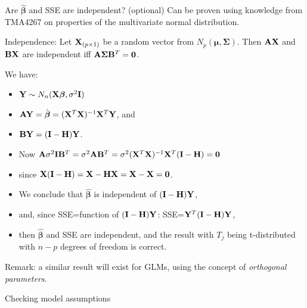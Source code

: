 \documentclass[
  ignorenonframetext,
]{beamer}
\begin{document}
\begin{frame}
\begin{block}{Are \(\hat{\boldsymbol{\beta}}\) and SSE are independent?
(optional)}
\label{are-hatboldsymbolbeta-and-sse-are-independent-optional}
Can be proven using knowledge from TMA4267 on properties of the
multivariate normal distribution.

Independence: Let \({\bf X}_{(p \times 1)}\) be a random vector from
\(N_p({\boldsymbol \mu},{\boldsymbol \Sigma})\). Then \({\bf A}{\bf X}\)
and \({\bf B}{\bf X}\) are independent iff
\({\bf A}{\boldsymbol \Sigma}{\bf B}^T={\bf 0}\).

We have:

\begin{itemize}
\item
  \({\bf Y}\sim N_n({\bf X}{\boldsymbol \beta},\sigma^2{\bf I})\)
\item
  \({\bf AY}=\hat{{\boldsymbol \beta}}=({\bf X}^T{\bf X})^{-1}{\bf X}^T {\bf Y}\),
  and
\item
  \({\bf BY}=({\bf I}-{\bf H}){\bf Y}\).
\item
  Now
  \({\bf A}\sigma^2{\bf I}{\bf B}^T=\sigma^2 {\bf A}{\bf B}^T=\sigma^2 ({\bf X}^T{\bf X})^{-1}{\bf X}^T ({\bf I}-{\bf H})={\bf 0}\)
\item
  since
  \({\bf X}({\bf I}-{\bf H})={\bf X}-{\bf HX}={\bf X}-{\bf X}={\bf 0}\).
\item
  We conclude that \(\hat{{\boldsymbol \beta}}\) is independent of
  \(({\bf I}-{\bf H}){\bf Y}\),
\item
  and, since SSE=function of \(({\bf I}-{\bf H}){\bf Y}\):
  SSE=\({\bf Y}^T({\bf I}-{\bf H}){\bf Y}\),
\item
  then \(\hat{{\boldsymbol \beta}}\) and SSE are independent, and the
  result with \(T_j\) being t-distributed with \(n-p\) degrees of
  freedom is correct.
\end{itemize}

Remark: a similar result will exist for GLMs, using the concept of
\emph{orthogonal parameters}.
\end{block}
\end{frame}

\begin{frame}{Checking model assumptions}
\label{checking-model-assumptions}
\end{frame}
\end{document}
